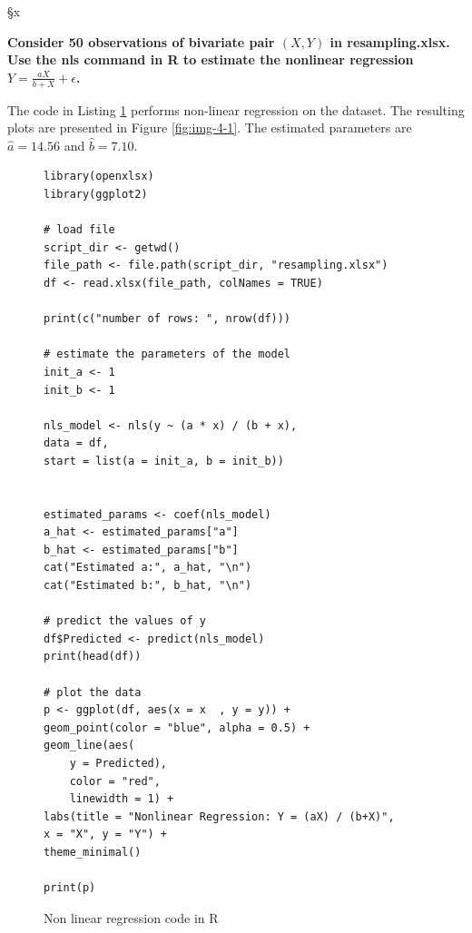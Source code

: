 §x\documentclass[]{article}
\begin{document}
\textbf{Consider 50 observations of bivariate pair $(X,Y)$ in resampling.xlsx. Use the nls command in R to estimate the nonlinear regression $Y=\frac{aX}{b+X} + \epsilon$.}

\bigskip

The code in Listing \ref{lst:nls} performs non-linear regression on the dataset. The resulting plots are presented in Figure \ref{fig:img-4-1}. The estimated parameters are $\hat{a} = 14.56$ and $\hat{b} = 7.10$.


\begin{figure}[H]
	\captionsetup{type=lstlisting}
	\begin{lstlisting}
library(openxlsx)
library(ggplot2)

# load file
script_dir <- getwd()
file_path <- file.path(script_dir, "resampling.xlsx")
df <- read.xlsx(file_path, colNames = TRUE)

print(c("number of rows: ", nrow(df)))

# estimate the parameters of the model
init_a <- 1
init_b <- 1

nls_model <- nls(y ~ (a * x) / (b + x),
data = df,
start = list(a = init_a, b = init_b))


estimated_params <- coef(nls_model)
a_hat <- estimated_params["a"]
b_hat <- estimated_params["b"]
cat("Estimated a:", a_hat, "\n")
cat("Estimated b:", b_hat, "\n")

# predict the values of y
df$Predicted <- predict(nls_model)
print(head(df))

# plot the data
p <- ggplot(df, aes(x = x  , y = y)) +
geom_point(color = "blue", alpha = 0.5) +
geom_line(aes(
	y = Predicted),
	color = "red",
	linewidth = 1) +
labs(title = "Nonlinear Regression: Y = (aX) / (b+X)",
x = "X", y = "Y") +
theme_minimal()

print(p)
	\end{lstlisting}
\caption{Non linear regression code in R}
\label{lst:nls}
\end{figure}
\end{document}
